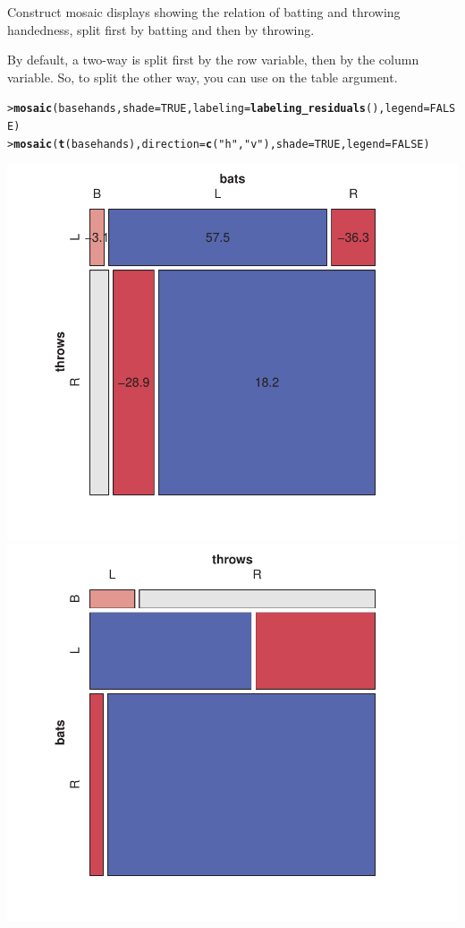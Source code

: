 \documentclass[10pt]{report}\usepackage[]{graphicx}\usepackage[]{color}
\makeatletter
\newcommand{\hlnum}[1]{\textcolor[rgb]{0.686,0.059,0.569}{#1}}%
\newcommand{\hlstr}[1]{\textcolor[rgb]{0.192,0.494,0.8}{#1}}%
\newcommand{\hlstd}[1]{\textcolor[rgb]{0.345,0.345,0.345}{#1}}%
\newcommand{\hlkwc}[1]{\textcolor[rgb]{0.333,0.667,0.333}{#1}}%
\newcommand{\hlkwd}[1]{\textcolor[rgb]{0.737,0.353,0.396}{\textbf{#1}}}%
\newenvironment{kframe}{%
 \def\at@end@of@kframe{}%
 \ifinner\ifhmode%
  \def\at@end@of@kframe{\end{minipage}}%
  \begin{minipage}{\columnwidth}%
 \fi\fi%
 \def\FrameCommand##1{\hskip\@totalleftmargin \hskip-\fboxsep
 \colorbox{shadecolor}{##1}\hskip-\fboxsep
     \hskip-\linewidth \hskip-\@totalleftmargin \hskip\columnwidth}%
 \MakeFramed {\advance\hsize-\width
   \@totalleftmargin\z@ \linewidth\hsize
   \@setminipage}}%
 {\par\unskip\endMakeFramed%
 \at@end@of@kframe}
\newenvironment{knitrout}{}{} %
\renewenvironment{knitrout}{\small\renewcommand{\baselinestretch}{.85}}{} %
\makeatother
\begin{document}
\begin{Exercises}
\begin{itemize*}
    \item Construct mosaic displays showing the relation of batting and throwing handedness, split first by batting and then by throwing.
    \begin{ans}
    By default, a two-way \ctab is split first by the row variable, then by the column variable. 
    So, to split the other way, you can use  on the table argument.
\begin{knitrout}\footnotesize
{}\color{fgcolor}\begin{kframe}
\begin{alltt}
\hlstd{> }\hlkwd{mosaic}\hlstd{(basehands,} \hlkwc{shade}\hlstd{=}\hlnum{TRUE}\hlstd{,} \hlkwc{labeling}\hlstd{=}\hlkwd{labeling_residuals}\hlstd{(),} \hlkwc{legend}\hlstd{=}\hlnum{FALSE}\hlstd{)}
\hlstd{> }\hlkwd{mosaic}\hlstd{(}\hlkwd{t}\hlstd{(basehands),} \hlkwc{direction}\hlstd{=}\hlkwd{c}\hlstd{(}\hlstr{"h"}\hlstd{,} \hlstr{"v"}\hlstd{),} \hlkwc{shade}\hlstd{=}\hlnum{TRUE}\hlstd{,} \hlkwc{legend}\hlstd{=}\hlnum{FALSE}\hlstd{)}
\end{alltt}
\end{kframe}

\centerline{\includegraphics[width=.5\textwidth]{soln/fig/ex5_3b-1} 
\includegraphics[width=.5\textwidth]{soln/fig/ex5_3b-2} }



\end{knitrout}
    \end{ans}
    

\end{itemize*}
\end{Exercises}
\end{document}
